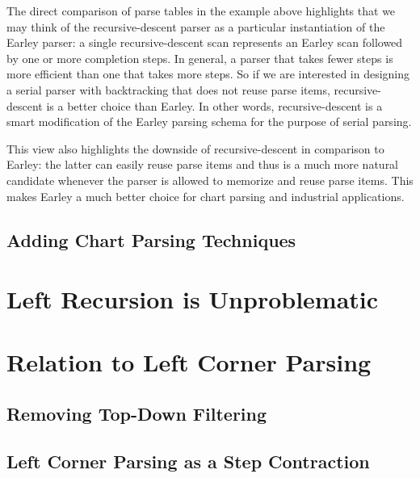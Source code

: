 %
The direct comparison of parse tables in the example above highlights that we may think of the recursive-descent parser as a particular instantiation of the Earley parser: a single recursive-descent scan represents an Earley scan followed by one or more completion steps.
In general, a parser that takes fewer steps is more efficient than one that takes more steps.
So if we are interested in designing a serial parser with backtracking that does not reuse parse items, recursive-descent is a better choice than Earley.
In other words, recursive-descent is a smart modification of the Earley parsing schema for the purpose of serial parsing.

This view also highlights the downside of recursive-descent in comparison to Earley: the latter can easily reuse parse items and thus is a much more natural candidate whenever the parser is allowed to memorize and reuse parse items.
This makes Earley a much better choice for chart parsing and industrial applications.

\subsection{Adding Chart Parsing Techniques}


\section{Left Recursion is Unproblematic}

\section{Relation to Left Corner Parsing}
\subsection{Removing Top-Down Filtering}
\subsection{Left Corner Parsing as a Step Contraction}

% 
% 
